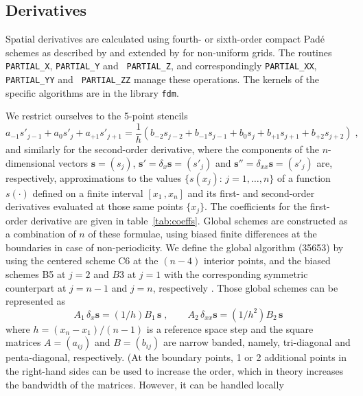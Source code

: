 \subsection{Derivatives}\label{sec:fdm}

Spatial derivatives are calculated using fourth- or sixth-order compact Pad\'{e}
schemes as described by \cite{Lele:1992} and extended by \cite{Shukla:2005} for
non-uniform grids. The routines {\tt PARTIAL\_X}, {\tt PARTIAL\_Y} and {\tt
  PARTIAL\_Z}, and correspondingly {\tt PARTIAL\_XX}, {\tt PARTIAL\_YY} and {\tt
  PARTIAL\_ZZ} manage these operations. The kernels of the specific algorithms
are in the library {\tt fdm}.

We restrict ourselves to the 5-point stencils
\begin{equation}
a_{-1}s'_{j-1}+a_{0}s'_{j}+a_{+1}s'_{j+1}=
\frac{1}{h}(b_{-2}s_{j-2}+b_{-1}s_{j-1}+b_{0}s_{j}+b_{+1}s_{j+1}+b_{+2}s_{j+2}) \;,
\label{equ:coefs}
\end{equation}
and similarly for the second-order derivative, where the components of the
$n$-dimensional vectors $\mathbf{s}=(s_j)$, $\mathbf{s'}=\delta_x
\mathbf{s}=(s'_j)$ and $\mathbf{s''}=\delta_{xx} \mathbf{s}=(s'_j)$ are,
respectively, approximations to the values $\{s(x_j):\, j=1,\ldots,n\}$ of a
function $s(\cdot)$ defined on a finite interval $[x_1\,,x_n]$ and its first-
and second-order derivatives evaluated at those same points $\{x_j\}$. The
coefficients for the first-order derivative are given in
table~\ref{tab:coeffs}. Global schemes are constructed as a combination of $n$ of
these formulae, using biased finite differences at the boundaries in case of
non-periodicity.  We define the global algorithm (35653) by using the centered
scheme C6 at the $(n-4)$ interior points, and the biased schemes B5 at $j=2$ and
$B3$ at $j=1$ with the corresponding symmetric counterpart at $j=n-1$ and $j=n$,
respectively \cite{Carpenter:1993}. Those global schemes can be represented as
\begin{equation}
  A_1\, \delta_x \mathbf{s}=(1/h)B_1\, \mathbf{s} \;, \qquad
  A_2\, \delta_{xx} \mathbf{s}=(1/h^2)B_2\, \mathbf{s}
\label{equ:fdm}
\end{equation}
where $h=(x_n-x_1)/(n-1)$ is a reference space step and the square matrices
$A=(a_{ij})$ and $B=(b_{ij})$ are narrow banded, namely, tri-diagonal and
penta-diagonal, respectively. (At the boundary points, 1 or 2 additional points
in the right-hand sides can be used to increase the order, which in theory
increases the bandwidth of the matrices. However, it can be handled locally
